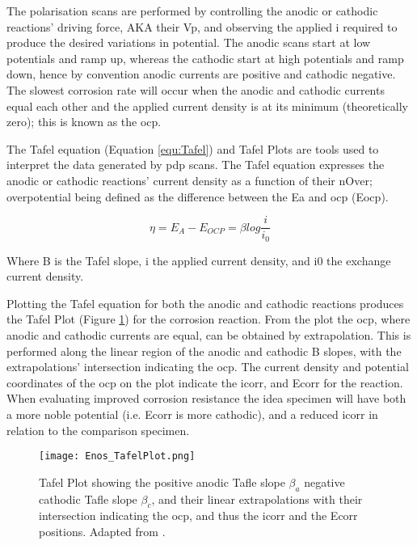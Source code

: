 \documentclass[a4paper,12pt,oneside]{report}%
\begin{document}
The polarisation scans are performed by controlling the anodic or cathodic reactions' driving force, AKA their \gls{Vp}, and observing the applied \gls{i} required to produce the desired variations in potential. The anodic scans start at low potentials and ramp up, whereas the cathodic start at high potentials and ramp down, hence by convention anodic currents are positive and cathodic negative.  The slowest corrosion rate will occur when the anodic and cathodic currents equal each other and the applied current density is at its minimum (theoretically zero); this is known as the \gls{ocp}. 

The Tafel equation (Equation \ref{equ:Tafel}) and Tafel Plots are tools used to interpret the data generated by \gls{pdp} scans. The Tafel equation expresses the anodic or cathodic reactions' current density as a function of their \gls{nOver}; overpotential being defined as the difference between the \gls{Ea} and \gls{ocp} (\acrshort{Eocp}).

\begin{equation}
\eta = E_{A} - E_{OCP}=\beta log \frac{i}{i_{0}}
\label{equ:Tafel}
\end{equation}

Where \acrshort{B} is the Tafel slope, \acrshort{i} the applied current density, and \acrshort{i0} the exchange current density. 

Plotting the Tafel equation for both the anodic and cathodic reactions produces the Tafel Plot (Figure \ref{fig:EnosTafel}) for the corrosion reaction. From the plot the \gls{ocp}, where anodic and cathodic currents are equal, can be obtained by extrapolation. This is performed along the linear region of the anodic and cathodic \acrshort{B} slopes, with the extrapolations' intersection indicating the \gls{ocp}. The current density and potential coordinates of the \gls{ocp} on the plot indicate the \gls{icorr}, and \gls{Ecorr} for the reaction. When evaluating improved corrosion resistance the idea specimen will have both a more noble potential (i.e. \gls{Ecorr} is more cathodic),  and a reduced \gls{icorr} in relation to the comparison specimen.

\begin{figure}[htb]
	\centering
	\texttt{[image: Enos\_TafelPlot.png]}
	\caption[Tafel Plot showing the positive anodic Tafle slope $\beta_{a}$, negative cathodic Tafle slope $\beta_{c}$, and their linear extrapolations with their intersection indicating the \acrshort{ocp}, and thus the \acrshort{icorr} and the \acrshort{Ecorr} positions.]{Tafel Plot showing the positive anodic Tafle slope $\beta_{a}$ negative cathodic Tafle slope $\beta_{c}$, and their linear extrapolations with their intersection indicating the \acrshort{ocp}, and thus the \acrshort{icorr} and the \acrshort{Ecorr} positions. Adapted from \cite{Enos1997}.}
	\label{fig:EnosTafel}
\end{figure}
\end{document}
